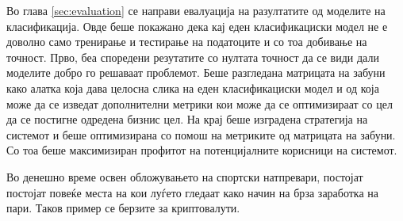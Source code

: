 Во глава \ref{sec:evaluation} се направи евалуација на разултатите од моделите на класификација. Овде беше покажано дека кај еден класификациски модел не е доволно само тренирање и тестирање на податоците и со тоа добивање на точност. Прво, беа споредени резутатите со нултата точност да се види дали моделите добро го решаваат проблемот. Беше разгледана матрицата на забуни како алатка која дава целосна слика на еден класификациски модел и од која може да се изведат дополнителни метрики кои може да се оптимизираат со цел да се постигне одредена бизнис цел. На крај беше изградена стратегија на системот и беше оптимизирана со помош на метриките од матрицата на забуни. Со тоа беше максимизиран профитот на потенцијалните корисници на системот.

Во денешно време освен обложувањето на спортски натпревари, постојат постојат повеќе места на кои луѓето гледаат како начин на брза заработка на пари. Таков пример се берзите за криптовалути.

